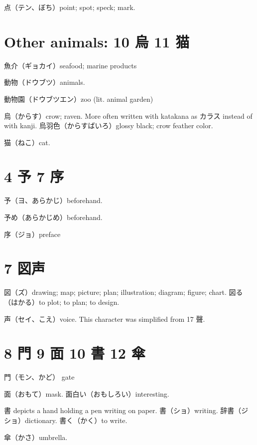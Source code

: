 点（テン、ぼち）point; spot; speck; mark.



\section{Other animals: 10 烏 11 猫}

魚介（ギョカイ）seafood; marine products

動物（ドウブツ）animals.

動物園（ドウブツエン）zoo (lit. animal garden)

烏（からす）crow; raven.
More often written with katakana as カラス instead of with kanji.
烏羽色（からすばいろ）glossy black; crow feather color.

猫（ねこ）cat.

\section{4 予 7 序}

予（ヨ、あらかじ）beforehand.

予め（あらかじめ）beforehand.

序（ジョ）preface

\section{7 図声}

図（ズ）drawing; map; picture; plan; illustration; diagram; figure; chart.
図る（はかる）to plot; to plan; to design.

声（セイ、こえ）voice.
This character was simplified from 17 聲.

\section{8 門 9 面 10 書 12 傘}

門（モン、かど） gate

面（おもて）mask.
面白い（おもしろい）interesting.

書 depicts a hand holding a pen writing on paper.
書（ショ）writing.
辞書（ジショ）dictionary.
書く（かく）to write.

傘（かさ）umbrella.
